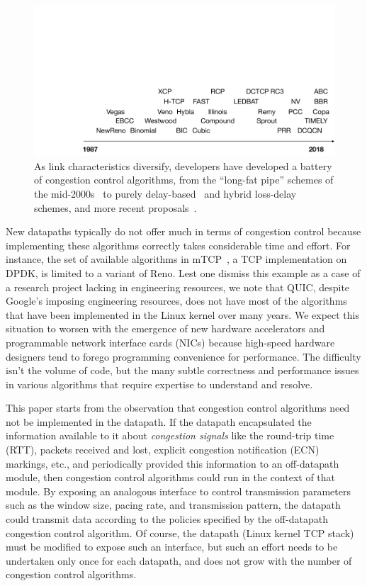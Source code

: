 \begin{figure}[t]
\centering
    \includegraphics[width=\columnwidth]{img/cc-timeline-nocongsig}
    \vspace{-1cm}
    \caption{As link characteristics diversify, developers have developed a battery of congestion control algorithms, from the ``long-fat pipe'' schemes of the mid-2000s~\cite{westwood, veno, htcp, hybla} to purely delay-based~\cite{vegas, fasttcp, ledbat, nv, timely} and hybrid loss-delay~\cite{illinois, compound} schemes, and more recent proposals~\cite{pcc, remy, sprout, bbr, copa, abc}.}\label{fig:cctimeline}
\end{figure}

New datapaths typically do not offer much in terms of congestion control because implementing these algorithms correctly takes considerable time and effort. For instance, the set of available algorithms in mTCP~\cite{mtcp}, a TCP implementation on DPDK, is limited to a variant of Reno. 
Lest one dismiss this example as a case of a research project lacking in engineering resources, we note that QUIC, despite Google's imposing engineering resources, does not have most of the algorithms that have been implemented in the Linux kernel over many years.  
We expect this situation to worsen with the emergence of new hardware accelerators and programmable network interface cards (NICs) because high-speed hardware designers tend to forego programming convenience for performance. The difficulty isn't the volume of code, but the many subtle correctness and performance issues in various algorithms that require expertise to understand and resolve.

This paper starts from the observation that congestion control algorithms need not be implemented in the datapath. If the datapath encapsulated the information available to it about {\em congestion signals} like the round-trip time (RTT), packets received and lost, explicit congestion notification (ECN) markings, etc., and periodically provided this information to an off-datapath module, then congestion control algorithms could run in the context of that module. By exposing an analogous interface to control transmission parameters such as the window size, pacing rate, and transmission pattern, the datapath could transmit data according to the policies specified by the off-datapath congestion control algorithm. Of course, the datapath (\eg Linux kernel TCP stack) must be modified to expose
such an interface, but such an effort needs to be undertaken only once for each datapath, and does not grow with the number of congestion control algorithms.

